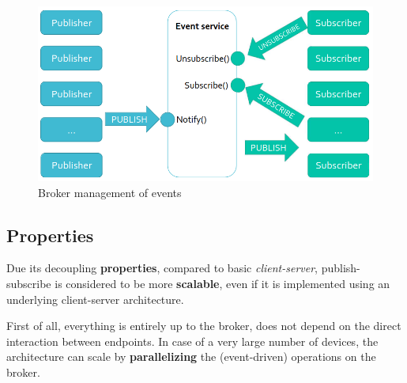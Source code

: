 \begin{figure}[htbp]
   \centering
   \includegraphics{images/ps_broker.png}
   \caption{Broker management of events}
   \label{fig:ps_broker}
\end{figure}
   
\nl

\subsection{Properties}
Due its decoupling \textbf{properties}, compared to basic \textit{client-server}, publish-subscribe is considered to be more \textbf{scalable}, even if it is implemented using an underlying client-server architecture.

First of all, everything is entirely up to the broker, does not depend on the direct interaction between endpoints.
In case of a very large number of devices, the architecture can scale by \textbf{parallelizing} the (event-driven) operations on the broker.

\nl


